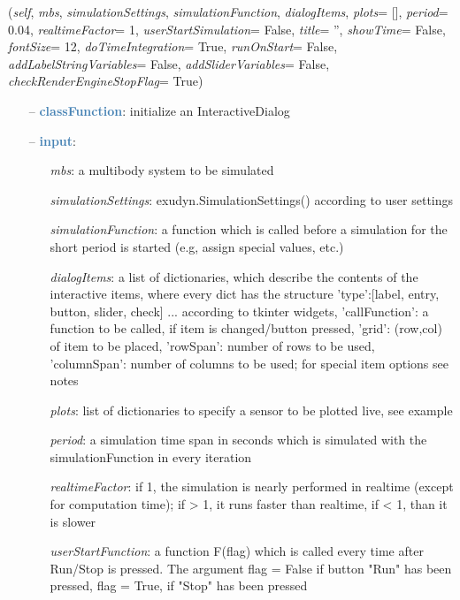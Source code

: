 \begin{itemize}[leftmargin=1.4cm]
\begin{itemize}[leftmargin=1.4cm]
\begin{itemize}[leftmargin=0.5cm]
\begin{itemize}[leftmargin=1.4cm]
\begin{itemize}[leftmargin=1.4cm]
\begin{itemize}[leftmargin=0.5cm]
\begin{itemize}[leftmargin=1.4cm]
\begin{itemize}[leftmargin=0.5cm]
\begin{itemize}[leftmargin=1.4cm]
\begin{itemize}[leftmargin=1.4cm]
\begin{flushleft}
({\it self}, {\it mbs}, {\it simulationSettings}, {\it simulationFunction}, {\it dialogItems}, {\it plots}= [], {\it period}= 0.04, {\it realtimeFactor}= 1, {\it userStartSimulation}= False, {\it title}= '', {\it showTime}= False, {\it fontSize}= 12, {\it doTimeIntegration}= True, {\it runOnStart}= False, {\it addLabelStringVariables}= False, {\it addSliderVariables}= False, {\it checkRenderEngineStopFlag}= True)
\end{flushleft}
\setlength{\itemindent}{0.7cm}
\begin{itemize}[leftmargin=0.7cm]
  \item[--]  \textcolor{steelblue}{\bf classFunction}: initialize an InteractiveDialog  \item[--]  \textcolor{steelblue}{\bf input}: \vspace{-6pt}
  \begin{itemize}[leftmargin=1.2cm]
\setlength{\itemindent}{-0.7cm}
    \item[] {\it mbs}: a multibody system to be simulated
    \item[] {\it   simulationSettings}: exudyn.SimulationSettings() according to user settings
    \item[] {\it   simulationFunction}: a function which is called before a simulation for the short period is started (e.g, assign special values, etc.)
    \item[] {\it   dialogItems}: a list of dictionaries, which describe the contents of the interactive items, where every dict has the structure {'type':[label, entry, button, slider, check] ... according to tkinter widgets, 'callFunction': a function to be called, if item is changed/button pressed, 'grid': (row,col) of item to be placed, 'rowSpan': number of rows to be used, 'columnSpan': number of columns to be used; for special item options see notes}
    \item[] {\it   plots}: list of dictionaries to specify a sensor to be plotted live, see example
    \item[] {\it   period}: a simulation time span in seconds which is simulated with the simulationFunction in every iteration
    \item[] {\it   realtimeFactor}: if 1, the simulation is nearly performed in realtime (except for computation time); if > 1, it runs faster than realtime, if < 1, than it is slower
    \item[] {\it   userStartFunction}: a function F(flag) which is called every time after Run/Stop is pressed. The argument flag = False if button "Run" has been pressed, flag = True, if "Stop" has been pressed

\end{itemize}
\end{itemize}
\end{itemize}
\end{itemize}
\end{itemize}
\end{itemize}
\end{itemize}
\end{itemize}
\end{itemize}
\end{itemize}
\end{itemize}
\end{itemize}
